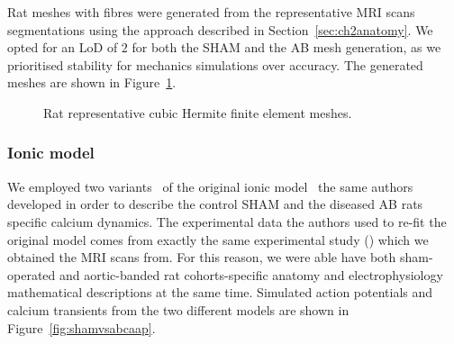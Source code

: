 \noindent
Rat meshes with fibres were generated from the representative MRI scans segmentations using the approach described in Section~\ref{sec:ch2anatomy}. We opted for an LoD of $2$ for both the SHAM and the AB mesh generation, as we prioritised stability for mechanics simulations over accuracy. The generated meshes are shown in Figure~\ref{fig:ratrepgeom}.

\begin{figure}[!ht]
    \myfloatalign
    \quad
    \caption{Rat representative cubic Hermite finite element meshes.}
    \label{fig:ratrepgeom}
\end{figure}


%
%
%
\subsubsection{Ionic model}\label{sec:ch4ionicmodel}
We employed two variants~\cite{Gattoni:2017} of the original ionic model~\cite{Gattoni:2016} the same authors developed in order to describe the control SHAM and the diseased AB rats specific calcium dynamics. The experimental data the authors used to re-fit the original model comes from exactly the same experimental study (\cite{Roe:2017}) which we obtained the MRI scans from. For this reason, we were able have both sham-operated and aortic-banded rat cohorts-specific anatomy and electrophysiology mathematical descriptions at the same time. Simulated action potentials and calcium transients from the two different models are shown in Figure~\ref{fig:shamvsabcaap}.

